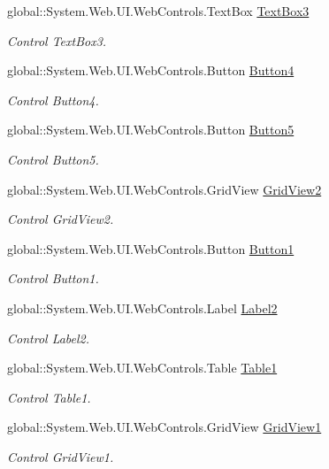 \begin{DoxyCompactItemize}
global\+::\+System.\+Web.\+U\+I.\+Web\+Controls.\+Text\+Box \mbox{\hyperlink{class_inicio_1_1_registrados_a42dd2c03767d9a49a113c1c4e864d790}{Text\+Box3}}
\begin{DoxyCompactList}\small\item\em Control Text\+Box3. \end{DoxyCompactList}\item 
global\+::\+System.\+Web.\+U\+I.\+Web\+Controls.\+Button \mbox{\hyperlink{class_inicio_1_1_registrados_a17ce0318c403c057f81a1d740673a57f}{Button4}}
\begin{DoxyCompactList}\small\item\em Control Button4. \end{DoxyCompactList}\item 
global\+::\+System.\+Web.\+U\+I.\+Web\+Controls.\+Button \mbox{\hyperlink{class_inicio_1_1_registrados_a07302395de09db810ad8f7f096762449}{Button5}}
\begin{DoxyCompactList}\small\item\em Control Button5. \end{DoxyCompactList}\item 
global\+::\+System.\+Web.\+U\+I.\+Web\+Controls.\+Grid\+View \mbox{\hyperlink{class_inicio_1_1_registrados_acf5a95ef87b37efcf6ad23cb0df13110}{Grid\+View2}}
\begin{DoxyCompactList}\small\item\em Control Grid\+View2. \end{DoxyCompactList}\item 
global\+::\+System.\+Web.\+U\+I.\+Web\+Controls.\+Button \mbox{\hyperlink{class_inicio_1_1_registrados_acef829ede3774fe5a9e0cf940d35e6ef}{Button1}}
\begin{DoxyCompactList}\small\item\em Control Button1. \end{DoxyCompactList}\item 
global\+::\+System.\+Web.\+U\+I.\+Web\+Controls.\+Label \mbox{\hyperlink{class_inicio_1_1_registrados_ab7c3cf09be993fe6a07f31881ba27159}{Label2}}
\begin{DoxyCompactList}\small\item\em Control Label2. \end{DoxyCompactList}\item 
global\+::\+System.\+Web.\+U\+I.\+Web\+Controls.\+Table \mbox{\hyperlink{class_inicio_1_1_registrados_a0c8cbd7625175b47e930f927da038acc}{Table1}}
\begin{DoxyCompactList}\small\item\em Control Table1. \end{DoxyCompactList}\item 
global\+::\+System.\+Web.\+U\+I.\+Web\+Controls.\+Grid\+View \mbox{\hyperlink{class_inicio_1_1_registrados_aad3adbb47738fefadfe5efa1dfb19b92}{Grid\+View1}}
\begin{DoxyCompactList}\small\item\em Control Grid\+View1. \end{DoxyCompactList}\end{DoxyCompactItemize}


